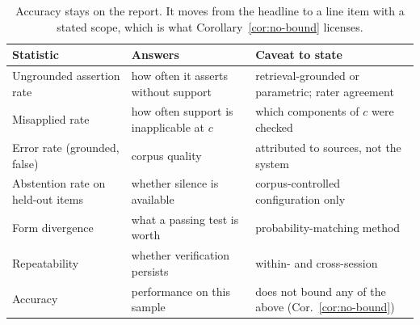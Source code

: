 \begin{table}[ht]
  \centering
  \small
  \begin{tabular}{@{}>{\raggedright\arraybackslash}p{4.2cm}>{\raggedright\arraybackslash}p{4.0cm}>{\raggedright\arraybackslash}p{5.4cm}@{}}
    \toprule
    Statistic & Answers & Caveat to state \\
    \midrule
    Ungrounded assertion rate
      & how often it asserts without support
      & retrieval-grounded or parametric; rater agreement \\
    \addlinespace
    Misapplied rate
      & how often support is inapplicable at $c$
      & which components of $c$ were checked \\
    \addlinespace
    Error rate (grounded, false)
      & corpus quality
      & attributed to sources, not the system \\
    \addlinespace
    Abstention rate on held-out items
      & whether silence is available
      & corpus-controlled configuration only \\
    \addlinespace
    Form divergence
      & what a passing test is worth
      & probability-matching method \\
    \addlinespace
    Repeatability
      & whether verification persists
      & within- and cross-session \\
    \addlinespace
    Accuracy
      & performance on this sample
      & does not bound any of the above (Cor.~\ref{cor:no-bound}) \\
    \bottomrule
  \end{tabular}
  \caption{Accuracy stays on the report. It moves from the headline to a line item
    with a stated scope, which is what Corollary~\ref{cor:no-bound} licenses.}
  \label{tab:report}
\end{table}
